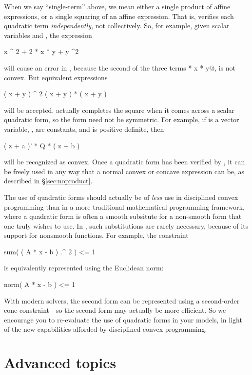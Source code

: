 \documentclass[12pt]{article}
\begin{document}
When we say ``single-term'' above, we mean either a single product of
affine expressions, or
a single squaring of an affine expression. That is, \cvx
verifies each quadratic term \emph{independently}, not collectively.
So, for example, given scalar variables \verb@x@ and \verb@y@,
the expression
\begin{code}
	x ^ 2 + 2 * x * y + y ^2
\end{code}
will cause an error in \cvx, because the second of the three terms
 * x * y@, is not convex. But equivalent expressions
\begin{code}
	( x + y ) ^ 2
	( x + y ) * ( x + y )
\end{code}
will be accepted. \cvx actually completes the
square when it comes across a scalar quadratic form, so the form
need not be symmetric. For example,
if \verb@z@ is a vector variable, \verb@a@, \verb@b@ are constants,
and \verb@Q@ is positive definite, then
\begin{code}
	( z + a )' * Q * ( z + b )
\end{code}
will be recognized as convex. Once a quadratic form has been verified by \cvx,
it can be freely
used in any way that a normal convex or concave expression can be,
as described in \S\ref{sec:noproduct}.

The use of quadratic forms should actually be
of \emph{less} use in disciplined convex programming
than in a more traditional mathematical programming framework,
where a quadratic form is often a smooth subsitute 
for a non-smooth form that one truly wishes to use. In
\cvx, such substitutions are rarely necessary, because of its support
for nonsmooth functions. For example,
the constraint
\begin{code}
	sum( ( A * x - b ) .^ 2 ) <= 1
\end{code}
is equivalently represented using the Euclidean norm:
\begin{code}
	norm( A * x - b ) <= 1
\end{code}
With modern solvers, the second form can be represented using a second-order cone
constraint---so the second form may actually be more efficient. So we encourage
you to re-evaluate the use of quadratic forms in your models, in light of the
new capabilities afforded by disciplined convex programming.

\section{Advanced topics}
\end{document}
